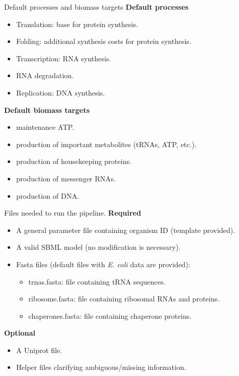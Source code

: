 \documentclass{beamer}
\begin{document}
\begin{frame}{Default processes and biomass targets}
  \textbf{Default processes}
  \begin{itemize}
    \item Translation: base for protein synthesis.
    \item Folding: additional synthesis costs for protein synthesis.
    \item Transcription: RNA synthesis.
    \item RNA degradation.
    \item Replication: DNA synthesis.
  \end{itemize}
  \textbf{Default biomass targets}
  \begin{itemize}
    \item maintenance ATP.
    \item production of important metabolites (tRNAs, ATP, etc.).
    \item production of housekeeping proteins.
    \item production of messenger RNAs.
    \item production of DNA.
  \end{itemize}
\end{frame}

\begin{frame}{Files needed to run the pipeline.}
  \textbf{Required}
  \begin{itemize}
    \item A general parameter file containing organism ID (template provided).
    \item A valid SBML model (no modification is necessary).
    \item Fasta files (default files with \textit{E. coli} data are provided):
    \begin{itemize}
      \item trnas.fasta: file containing tRNA sequences.
      \item ribosome.fasta: file containing ribosomal RNAs and proteins.
      \item chaperones.fasta: file containing chaperone proteins.
    \end{itemize}
  \end{itemize}
  \textbf{Optional}
  \begin{itemize}
    \item A Uniprot file.
    \item Helper files clarifying ambiguous/missing information.
  \end{itemize}
\end{frame}
\end{document}
